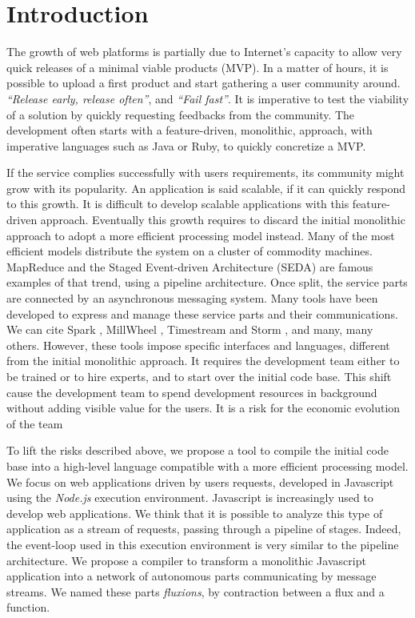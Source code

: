 \section{Introduction}

The growth of web platforms is partially due to Internet's capacity to allow very quick releases of a minimal viable products (MVP).
In a matter of hours, it is possible to upload a first product and start gathering a user community around.
\textit{``Release early, release often''}, and \textit{``Fail fast''}.
It is imperative to test the viability of a solution by quickly requesting feedbacks from the community.
The development often starts with a feature-driven, monolithic, approach, with imperative languages such as Java or Ruby, to quickly concretize a MVP.

If the service complies successfully with users requirements, its community might grow with its popularity.
An application is said scalable, if it can quickly respond to this growth.
It is difficult to develop scalable applications with this feature-driven approach.
Eventually this growth requires to discard the initial monolithic approach to adopt a more efficient processing model instead.
Many of the most efficient models distribute the system on a cluster of commodity machines\cite{Fox1997}.
MapReduce \cite{Dean2008} and the Staged Event-driven Architecture (SEDA) \cite{Welsh2000} are famous examples of that trend, using a pipeline architecture.
Once split, the service parts are connected by an asynchronous messaging system.
Many tools have been developed to express and manage these service parts and their communications.
We can cite Spark \cite{Zaharia2010}, MillWheel \cite{Akidau2013}, Timestream \cite{Qian2013} and Storm \cite{Marz2011}, and many, many others. 
However, these tools impose specific interfaces and languages, different from the initial monolithic approach.
It requires the development team either to be trained or to hire experts, and to start over the initial code base.
This shift cause the development team to spend development resources in background without adding visible value for the users.
It is a risk for the economic evolution of the team

To lift the risks described above, we propose a tool to compile the initial code base into a high-level language compatible with a more efficient processing model.
We focus on web applications driven by users requests, developed in Javascript using the \textit{Node.js} execution environment.
Javascript is increasingly used to develop web applications.
We think that it is possible to analyze this type of application as a stream of requests, passing through a pipeline of stages.
Indeed, the event-loop used in this execution environment is very similar to the pipeline architecture.
We propose a compiler to transform a monolithic Javascript application into a network of autonomous parts communicating by message streams.
We named these parts \textit{fluxions}, by contraction between a flux and a function.

